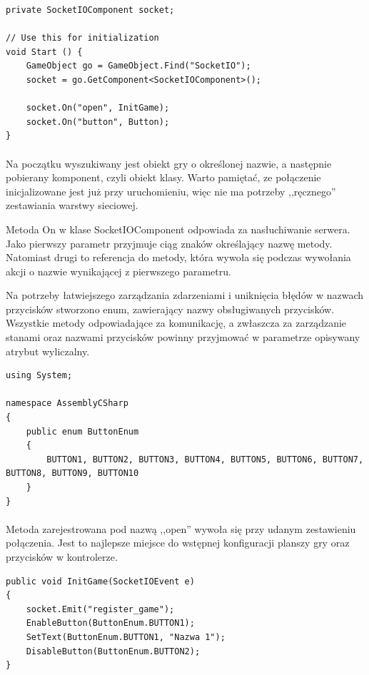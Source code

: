 \begin{lstlisting}[language=CSharp]
private SocketIOComponent socket;

// Use this for initialization
void Start () {
	GameObject go = GameObject.Find("SocketIO");
	socket = go.GetComponent<SocketIOComponent>();

	socket.On("open", InitGame);
	socket.On("button", Button);
}
\end{lstlisting}

\paragraph{}
Na początku wyszukiwany jest obiekt gry o określonej nazwie, a następnie pobierany komponent, czyli obiekt klasy. Warto pamiętać, ze połączenie inicjalizowane jest już przy uruchomieniu, więc nie ma potrzeby ,,ręcznego'' zestawiania warstwy sieciowej.

Metoda On w klase SocketIOComponent odpowiada za nasłuchiwanie serwera. Jako pierwszy parametr przyjmuje ciąg znaków określający nazwę metody. Natomiast drugi to referencja do metody, która wywoła się podczas wywołania akcji o nazwie wynikającej z pierwszego parametru.

Na potrzeby łatwiejszego zarządzania zdarzeniami i uniknięcia błędów w nazwach przycisków stworzono enum, zawierający nazwy obsługiwanych przycisków. Wszystkie metody odpowiadające za komunikację, a zwłaszcza za zarządzanie stanami oraz nazwami przycisków powinny przyjmować w parametrze opisywany atrybut wyliczalny.

\begin{lstlisting}[language=CSharp]
using System;

namespace AssemblyCSharp
{
	public enum ButtonEnum
	{
		BUTTON1, BUTTON2, BUTTON3, BUTTON4, BUTTON5, BUTTON6, BUTTON7, BUTTON8, BUTTON9, BUTTON10
	}
}

\end{lstlisting}

\paragraph{}
Metoda zarejestrowana pod nazwą ,,open'' wywoła się przy udanym zestawieniu połączenia. Jest to najlepsze miejsce do wstępnej konfiguracji planszy gry oraz przycisków w kontrolerze.

\begin{lstlisting}[language=CSharp]
public void InitGame(SocketIOEvent e)
{
	socket.Emit("register_game");
	EnableButton(ButtonEnum.BUTTON1);
	SetText(ButtonEnum.BUTTON1, "Nazwa 1");
	DisableButton(ButtonEnum.BUTTON2);
}
\end{lstlisting}

